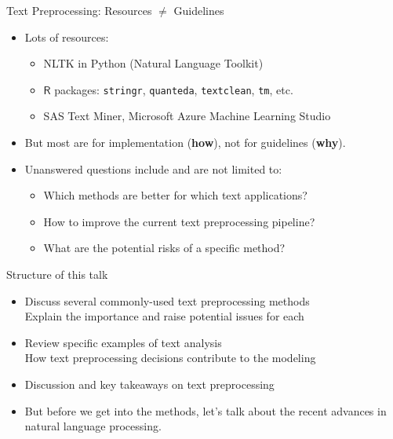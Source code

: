 \documentclass{beamer}
\renewcommand{\cite}{\citep}
\begin{document}
\begin{frame}{Text Preprocessing: Resources $\neq$ Guidelines}
\begin{itemize}
\item Lots of resources:
	\begin{itemize}
	\item NLTK in Python (Natural Language Toolkit)~\cite{bird2009natural}
	\item $\mathsf{R}$ packages: \texttt{stringr}, \texttt{quanteda}, \texttt{textclean}, \texttt{tm}, etc.
	\item SAS Text Miner, Microsoft Azure Machine Learning Studio
	\end{itemize}
\item But most are for implementation (\textbf{how}), not for guidelines (\textbf{why}).
	\bigskip
\item Unanswered questions include and are not limited to:
	\begin{itemize}
	\item Which methods are better for which text applications? %
	\item How to improve the current text preprocessing pipeline?
	\item What are the potential risks of a specific method?
	\end{itemize}
\end{itemize}
\end{frame}

\begin{frame}{Structure of this talk}
\begin{itemize}
\item Discuss several commonly-used text preprocessing methods\\
	Explain the importance and raise potential issues for each
\item Review specific examples of text analysis\\
	How text preprocessing decisions contribute to the modeling
\item Discussion and key takeaways on text preprocessing
	\bigskip
\item But before we get into the methods, let's talk about the recent advances in natural language processing.
\end{itemize}
\end{frame}
\end{document}
